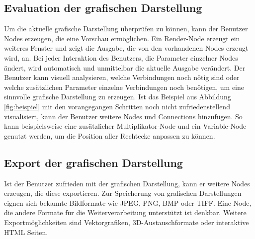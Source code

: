 \documentclass[a4paper, 
               12pt,
               DIV=calc,
               version=first,
               pdftex,
               headsepline,
               footsepline,
               bibtotocnumbered,
               liststotocnumbered]{scrreprt}
\begin{document}
\subsection{Evaluation der grafischen Darstellung}
Um die aktuelle grafische Darstellung überprüfen zu können, kann der Benutzer Nodes
erzeugen, die eine Vorschau ermöglichen. Ein Render-Node erzeugt ein weiteres
Fenster und zeigt die Ausgabe, die von den vorhandenen Nodes erzeugt wird, an.
Bei jeder Interaktion des Benutzers, die Parameter einzelner Nodes ändert,
wird automatisch und unmittelbar die aktuelle Ausgabe verändert.
Der Benutzer kann visuell analysieren, welche Verbindungen noch nötig sind
oder welche zusätzlichen Parameter einzelne Verbindungen noch benötigen, um eine sinnvolle grafische 
Darstellung zu erzeugen. Ist das Beispiel aus Abbildung \ref{fig:beispiel} mit den vorangegangen Schritten noch nicht
zufriedenstellend visualisiert, kann der Benutzer weitere Nodes und Connections
hinzufügen. So kann beispielsweise eine zusätzlicher Multiplikator-Node und ein
Variable-Node genutzt werden, um die Position aller Rechtecke anpassen zu können.
\subsection{Export der grafischen Darstellung}
Ist der Benutzer zufrieden mit der grafischen Darstellung, kann er weitere Nodes
erzeugen, die diese exportieren. Zur Speicherung von grafischen Darstellungen
eignen sich bekannte Bildformate wie JPEG, PNG, BMP oder TIFF. Eine Node, die andere Formate
für die Weiterverarbeitung unterstützt ist denkbar. Weitere Exportmöglichkeiten
sind Vektorgrafiken, 3D-Austauschformate oder interaktive HTML Seiten.
\end{document}
